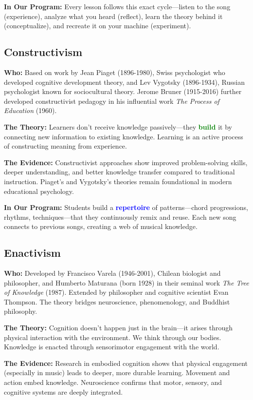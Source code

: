 \documentclass[11pt,letterpaper]{article}
\newcommand{\bluepurple}[1]{\textcolor{blue}{\textbf{#1}}}
\newcommand{\greentext}[1]{\textcolor{green}{\textbf{#1}}}
\begin{document}
\textbf{In Our Program:} Every lesson follows this exact cycle—listen to the song (experience), analyze what you heard (reflect), learn the theory behind it (conceptualize), and recreate it on your machine (experiment).

\subsection*{Constructivism}

\textbf{Who:} Based on work by Jean Piaget (1896-1980), Swiss psychologist who developed cognitive development theory, and Lev Vygotsky (1896-1934), Russian psychologist known for sociocultural theory. Jerome Bruner (1915-2016) further developed constructivist pedagogy in his influential work \textit{The Process of Education} (1960).

\textbf{The Theory:} Learners don't receive knowledge passively—they \greentext{build} it by connecting new information to existing knowledge. Learning is an active process of constructing meaning from experience.

\textbf{The Evidence:} Constructivist approaches show improved problem-solving skills, deeper understanding, and better knowledge transfer compared to traditional instruction. Piaget's and Vygotsky's theories remain foundational in modern educational psychology.

\textbf{In Our Program:} Students build a \bluepurple{repertoire} of patterns—chord progressions, rhythms, techniques—that they continuously remix and reuse. Each new song connects to previous songs, creating a web of musical knowledge.

\subsection*{Enactivism}

\textbf{Who:} Developed by Francisco Varela (1946-2001), Chilean biologist and philosopher, and Humberto Maturana (born 1928) in their seminal work \textit{The Tree of Knowledge} (1987). Extended by philosopher and cognitive scientist Evan Thompson. The theory bridges neuroscience, phenomenology, and Buddhist philosophy.

\textbf{The Theory:} Cognition doesn't happen just in the brain—it arises through physical interaction with the environment. We think through our bodies. Knowledge is enacted through sensorimotor engagement with the world.

\textbf{The Evidence:} Research in embodied cognition shows that physical engagement (especially in music) leads to deeper, more durable learning. Movement and action embed knowledge. Neuroscience confirms that motor, sensory, and cognitive systems are deeply integrated.
\end{document}
